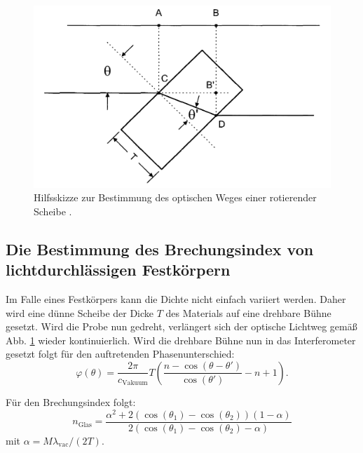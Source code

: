 \begin{figure}
	\centering
	\includegraphics[width=\linewidth-100pt,height=\textheight-100pt,keepaspectratio]{content/Bilder/drehscheibeskizze.png}
	\caption{Hilfsskizze zur Bestimmung des optischen Weges einer rotierender Scheibe \cite{V64}.}
	\label{fig:Drehscheibe}
\end{figure}

\subsection{Die Bestimmung des Brechungsindex von lichtdurchlässigen Festkörpern}
Im Falle eines Festkörpers kann die Dichte nicht einfach variiert werden. Daher wird eine dünne Scheibe der Dicke $T$ des Materials auf eine drehbare Bühne gesetzt. Wird die Probe nun gedreht, verlängert sich der optische Lichtweg gemäß Abb. \ref{fig:Drehscheibe} wieder kontinuierlich. Wird die drehbare Bühne nun in das Interferometer gesetzt folgt für den auftretenden Phasenunterschied:
\begin{equation}
    \varphi(\theta) = \frac{2 \pi}{c_\text{Vakuum}} T \left( \frac{n - \cos(\theta - \theta ')}{\cos(\theta')} - n + 1 \right) \text{.} \label{eq:phi}
\end{equation}

Für den Brechungsindex folgt:
\begin{equation}
 n_\text{Glas} = \frac{\alpha^2 + 2 (\cos(\theta_1)-\cos(\theta_2))(1-\alpha)}{2 (\cos(\theta_1)-\cos(\theta_2)-\alpha)} \label{eq:glas}
\end{equation}
mit $\alpha = M \lambda_\text{vac}/(2 T)$.



